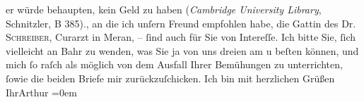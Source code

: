 \begin{ledgroupsized}[t]{13cm}
{{{                  er würde behaupten, kein Geld zu haben (\emph{Cambridge University Library}, Schnitzler, B
                  385).}}}\label{K_L00199_2h}, an die ich unſern Freund empfohlen habe, die Gattin des Dr.
                  \textsc{Schreiber}, Curarzt in Meran, – ſind auch für Sie
               von Intereſſe. Ich bitte Sie, ſich vielleicht an Bahr zu wenden, was Sie ja von uns dreien am \label{K_L00199_3v}\label{K_L00199_3h}
               u beſten können, {\pb}und mich ſo raſch als möglich von dem
               Ausfall Ihrer Bemühungen zu unterrichten, ſowie die beiden Briefe mir
               zurückzuſchicken.\pend
           \pstart
           Ich bin mit herzlichen Grüßen{\\[\baselineskip]}Ihr\spacefill\mbox{Arthur}\pend
           \leftskip=0em{}
         
         \endnumbering{}\end{ledgroupsized}  \newcommand{\dateiname}{L00199}\newcommand{\titel}{Arthur Schnitzler an Hugo von Hofmannsthal, [21. 4. 1893?]}\newcommand{\editorInnen}{ Martin Anton Müller und Gerd-Hermann Susen}
      